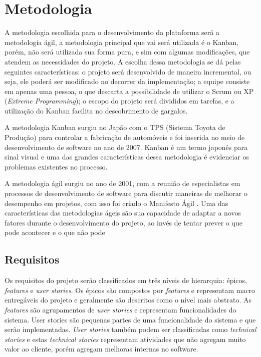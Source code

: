 \chapter[Metodologia]{Metodologia}
A metodologia escolhida para o desenvolvimento da plataforma será a metodologia ágil, a metodologia principal que vai será utilizada é o Kanban, porém, não será utilizada sua forma pura, e sim com algumas modificações, que atendem as necessidades do projeto. A escolha dessa metodologia se dá pelas seguintes características: o projeto será desenvolvido de maneira incremental, ou seja, ele poderá ser modificado no decorrer da implementação; a equipe consiste em apenas uma pessoa, o que descarta a possibilidade de utilizar o Scrum ou XP (\textit{Extreme Programming}); o escopo do projeto será divididos em tarefas, e a utilização do Kanban facilita no descobrimento de gargalos.

A metodologia Kanban surgiu no Japão com o TPS (Sistema Toyota de Produção) \cite{tps} para controlar a fabricação de automóveis e foi inserida no meio de desenvolvimento de software no ano de 2007. Kanban é um termo japonês para sinal visual e uma das grandes características dessa metodologia é evidenciar os problemas existentes no processo. 

A metodologia ágil surgiu no ano de 2001, com a reunião de especialistas em processos de desenvolvimento de software para discutir maneiras de melhorar o desempenho em projetos, com isso foi criado o Manifesto Ágil \cite{agil}. Uma das características das metodologias ágeis são sua capacidade de adaptar a novos fatores durante o desenvolvimento do projeto, ao invés de tentar prever o que pode acontecer e o que não pode
\section{Requisitos}
Os requisitos do projeto serão classificados em três níveis de hierarquia:  épicos, \textit{features} e \textit{user stories}. Os épicos são compostos por \textit{features} e representam macro entregáveis do projeto e geralmente são descritos como o nível mais abstrato. As \textit{features} são agrupamentos de \textit{user stories} e representam funcionalidades do sistema. User stories são pequenas partes de uma funcionalidade do sistema e que serão implementadas. \textit{User stories} também podem ser classificadas como \textit{technical stories} e estas \textit{technical stories} representam atividades que não agregam muito valor ao cliente, porém agregam melhoras internas no software.

